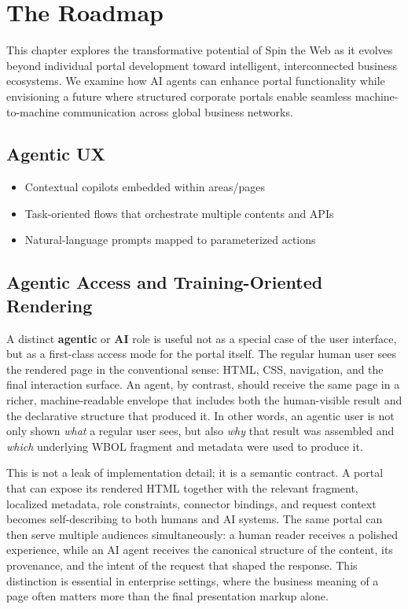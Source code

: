 
\chapter{The Roadmap}
\label{chap:roadmap}

This chapter explores the transformative potential of Spin the Web as it evolves beyond individual portal development toward intelligent, interconnected business ecosystems. We examine how AI agents can enhance portal functionality while envisioning a future where structured corporate portals enable seamless machine-to-machine communication across global business networks.

\section{Agentic UX}
\begin{itemize}
	\item Contextual copilots embedded within areas/pages
	\item Task-oriented flows that orchestrate multiple contents and APIs
	\item Natural-language prompts mapped to parameterized actions
\end{itemize}

\section{Agentic Access and Training-Oriented Rendering}
\label{sec:agentic-access}

A distinct \textbf{agentic} or \textbf{AI} role is useful not as a special case of the user interface, but as a first-class access mode for the portal itself. The regular human user sees the rendered page in the conventional sense: HTML, CSS, navigation, and the final interaction surface. An agent, by contrast, should receive the same page in a richer, machine-readable envelope that includes both the human-visible result and the declarative structure that produced it. In other words, an agentic user is not only shown \emph{what} a regular user sees, but also \emph{why} that result was assembled and \emph{which} underlying WBOL fragment and metadata were used to produce it.

This is not a leak of implementation detail; it is a semantic contract. A portal that can expose its rendered HTML together with the relevant \wbol{} fragment, localized metadata, role constraints, connector bindings, and request context becomes self-describing to both humans and AI systems. The same portal can then serve multiple audiences simultaneously: a human reader receives a polished experience, while an AI agent receives the canonical structure of the content, its provenance, and the intent of the request that shaped the response. This distinction is essential in enterprise settings, where the business meaning of a page often matters more than the final presentation markup alone.

